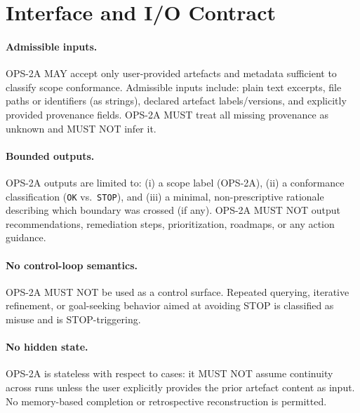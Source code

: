 
\section{Interface and I/O Contract}

\paragraph{Admissible inputs.}
OPS-2A MAY accept only user-provided artefacts and metadata sufficient to classify scope
conformance. Admissible inputs include: plain text excerpts, file paths or identifiers (as
strings), declared artefact labels/versions, and explicitly provided provenance fields.
OPS-2A MUST treat all missing provenance as unknown and MUST NOT infer it.

\paragraph{Bounded outputs.}
OPS-2A outputs are limited to:
(i) a scope label (OPS-2A),
(ii) a conformance classification (\texttt{OK} vs.\ \texttt{STOP}),
and (iii) a minimal, non-prescriptive rationale describing which boundary was crossed (if any).
OPS-2A MUST NOT output recommendations, remediation steps, prioritization, roadmaps, or
any action guidance.

\paragraph{No control-loop semantics.}
OPS-2A MUST NOT be used as a control surface. Repeated querying, iterative refinement,
or goal-seeking behavior aimed at avoiding STOP is classified as misuse and is STOP-triggering.

\paragraph{No hidden state.}
OPS-2A is stateless with respect to cases: it MUST NOT assume continuity across runs unless
the user explicitly provides the prior artefact content as input. No memory-based completion
or retrospective reconstruction is permitted.
